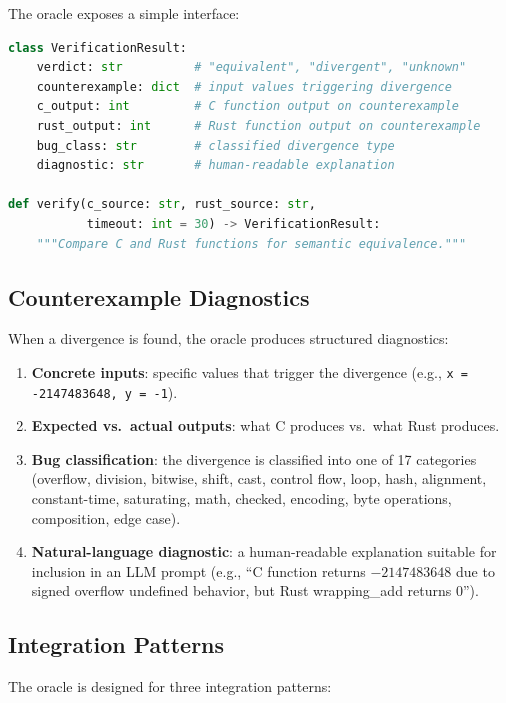 \documentclass[10pt,letterpaper]{article}
\begin{document}
The oracle exposes a simple interface:

\begin{lstlisting}[language=Python,caption={Verification Oracle API},label={lst:api}]
class VerificationResult:
    verdict: str          # "equivalent", "divergent", "unknown"
    counterexample: dict  # input values triggering divergence
    c_output: int         # C function output on counterexample
    rust_output: int      # Rust function output on counterexample
    bug_class: str        # classified divergence type
    diagnostic: str       # human-readable explanation

def verify(c_source: str, rust_source: str,
           timeout: int = 30) -> VerificationResult:
    """Compare C and Rust functions for semantic equivalence."""
\end{lstlisting}

\subsection{Counterexample Diagnostics}

When a divergence is found, the oracle produces structured diagnostics:

\begin{enumerate}[itemsep=1pt]
\item \textbf{Concrete inputs}: specific values that trigger the divergence
  (e.g., \texttt{x = -2147483648, y = -1}).
\item \textbf{Expected vs.\ actual outputs}: what C produces vs.\ what Rust produces.
\item \textbf{Bug classification}: the divergence is classified into one of 17
  categories (overflow, division, bitwise, shift, cast, control flow, loop, hash,
  alignment, constant-time, saturating, math, checked, encoding, byte operations,
  composition, edge case).
\item \textbf{Natural-language diagnostic}: a human-readable explanation suitable
  for inclusion in an LLM prompt (e.g., ``C function returns $-2147483648$ due to
  signed overflow undefined behavior, but Rust wrapping\_add returns $0$'').
\end{enumerate}

\subsection{Integration Patterns}

The oracle is designed for three integration patterns:
\end{document}
